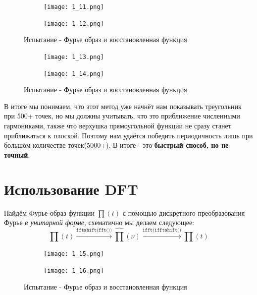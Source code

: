 \begin{figure}[!ht]
	\centering
\hspace*{\fill}%
	\begin{subfigure}[b]{0.49\textwidth}
        \centering
		\texttt{[image: 1\_11.png]}
	\end{subfigure}
	\hfill
	\begin{subfigure}[b]{0.49\textwidth}
        \centering
		\texttt{[image: 1\_12.png]}
	\end{subfigure}
	\caption{Испытание - Фурье образ и восстановленная функция}
\end{figure}

\begin{figure}[!ht]
	\centering
\hspace*{\fill}%
	\begin{subfigure}[b]{0.49\textwidth}
        \centering
		\texttt{[image: 1\_13.png]}
	\end{subfigure}
\hfill
	\begin{subfigure}[b]{0.49\textwidth}
        \centering
		\texttt{[image: 1\_14.png]}
	\end{subfigure}
	\caption{Испытание - Фурье образ и восстановленная функция}
\end{figure}

В итоге мы понимаем, что этот метод уже начнёт нам показывать треугольник при 500+ точек, но мы должны учитывать, что это приближение численными гармониками, также что верхушка прямоугольной функции не сразу станет приближаться к  плоской. 
Поэтому нам удаётся победить периодичность лишь при большом количестве точек(5000+). В итоге - это \textbf{ быстрый способ, но не точный}.

\newpage
\section{Использование DFT}

Найдём Фурье-образ функции $\prod(t)$ с помощью дискретного преобразования Фурье \textit{в унитарной форме}, схематично мы делаем следующее:
$$
\prod(t) \xrightarrow{\texttt{fftshift(fft())}} \hat{\prod}(\nu) \xrightarrow{\texttt{ifft(ifftshift()}} \prod(t)
$$

\begin{figure}[!ht]
	\centering
\hspace*{\fill}%
	\begin{subfigure}[b]{0.49\textwidth}
        \centering
		\texttt{[image: 1\_15.png]}
	\end{subfigure}
\hfill
	\begin{subfigure}[b]{0.49\textwidth}
        \centering
		\texttt{[image: 1\_16.png]}
	\end{subfigure}
    \caption{Испытание - Фурье образ и восстановленная функция}
\end{figure}

